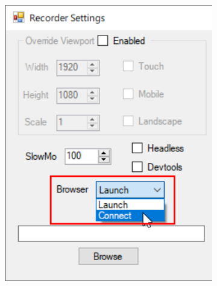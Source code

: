 \documentclass[12pt, a4paper, twoside]{article}
\begin{document}
	\begin{figure}[H]
		\centering
		\begin{minipage}{0.45\textwidth}
			\begin{subfigure}[t]{1.0\textwidth}
				\includegraphics[width=1.0\textwidth]{browserConnectionChange.png}
			\end{subfigure}	
		\end{minipage}
		\hfill
		\textrightarrow
		\hfill
		\begin{minipage}{0.45\textwidth}
			\begin{subfigure}[t]{1.0\textwidth}

\end{subfigure}
\end{minipage}
\end{figure}
\end{document}

